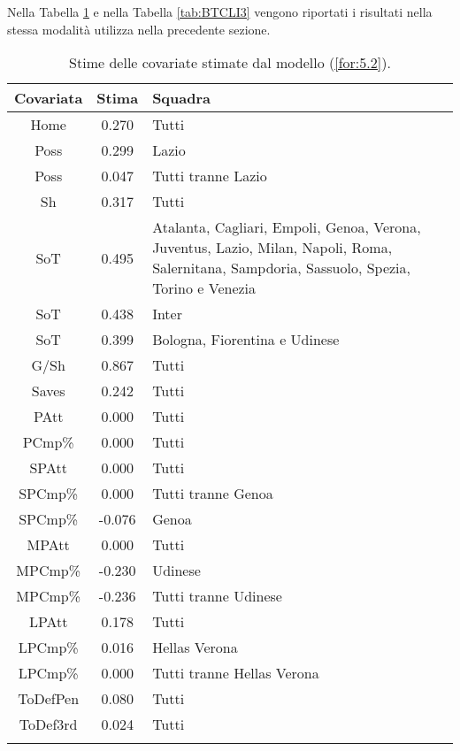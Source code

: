 Nella Tabella \ref{tab:BTCLI2} e nella Tabella \ref{tab:BTCLI3} vengono riportati i risultati nella stessa modalità utilizza nella precedente sezione.
\begin{table}[]%
	
	\renewcommand{\arraystretch}{1.7}
	\centering
	\begin{tabular}{ccp{10cm}}
		\hline	
		\rowcolor{SchoolColor2}
		\textbf{Covariata} & \textbf{Stima} & \textbf{Squadra} \\	
		\hline
		Home & 0.270 & Tutti\\
		Poss & 0.299 & Lazio \\
		Poss & 0.047 & Tutti tranne Lazio\\
		Sh & 0.317 & Tutti \\
		SoT & 0.495 & Atalanta, Cagliari, Empoli, Genoa, Verona, Juventus, Lazio, Milan, Napoli, Roma, Salernitana, Sampdoria, Sassuolo, Spezia, Torino e Venezia\\
		SoT & 0.438 & Inter\\
		SoT & 0.399 & Bologna, Fiorentina e Udinese \\
		G/Sh & 0.867 & Tutti \\
		Saves & 0.242 & Tutti \\
		PAtt & 0.000 & Tutti \\
		PCmp\% & 0.000 & Tutti \\
		SPAtt & 0.000 & Tutti \\
		SPCmp\% & 0.000 & Tutti tranne Genoa \\ 
		SPCmp\% & -0.076 & Genoa \\	
		MPAtt & 0.000 & Tutti \\ 
		MPCmp\% & -0.230 & Udinese \\
		MPCmp\% & -0.236 & Tutti tranne Udinese \\		
		LPAtt & 0.178 & Tutti \\
		LPCmp\% & 0.016 & Hellas Verona \\
		LPCmp\% & 0.000 & Tutti tranne Hellas Verona \\
		ToDefPen & 0.080 & Tutti \\      
		ToDef3rd & 0.024 & Tutti \\
		
		
		\hline
		& &  \\
		
	\end{tabular} \hbox{}
	\caption{Stime delle covariate stimate dal modello (\ref{for:5.2}).} \label{tab:BTCLI2} 
	
\end{table}

